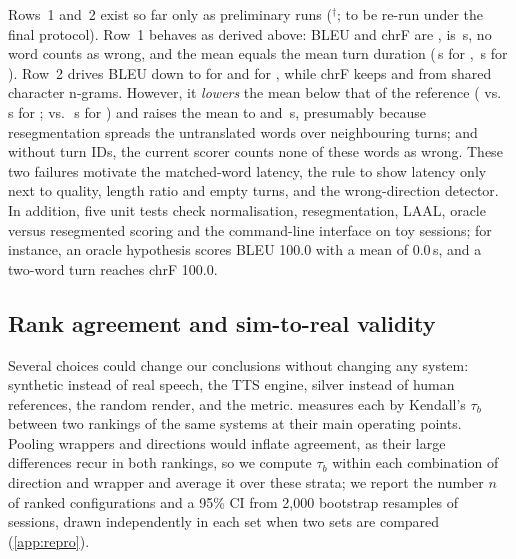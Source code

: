 Rows~1 and~2 exist so far only as preliminary runs ($^\dagger$; to be re-run under the final protocol). Row~1 behaves as derived above: BLEU and chrF are , \eo is \,s, no word counts as wrong, and the mean \laal equals the mean turn duration (\,s for \ende, \,s for \deen). Row~2 drives BLEU down to  for \ende and  for \deen, while chrF keeps  and  from shared character n-grams. However, it \emph{lowers} the mean \laal below that of the reference ( vs.\ \,s for \ende;  vs.\ \,s for \deen) and raises the mean \eo to  and \,s, presumably because resegmentation spreads the untranslated words over neighbouring turns; and without turn IDs, the current scorer counts none of these words as wrong. These two failures motivate the matched-word latency, the rule to show latency only next to quality, length ratio and empty turns, and the wrong-direction detector. In addition, five unit tests check normalisation, resegmentation, LAAL, oracle versus resegmented scoring and the command-line interface on toy sessions; for instance, an oracle hypothesis scores BLEU 100.0 with a mean \eo of 0.0\,s, and a two-word turn reaches chrF 100.0.

\subsection{Rank agreement and sim-to-real validity}



Several choices could change our conclusions without changing any system: synthetic instead of real speech, the TTS engine, silver instead of human references, the random render, and the metric.  measures each by Kendall's $\tau_b$ between two rankings of the same systems at their main operating points. Pooling wrappers and directions would inflate agreement, as their large differences recur in both rankings, so we compute $\tau_b$ within each combination of direction and wrapper and average it over these strata; we report the number $n$ of ranked configurations and a 95\% CI from 2,000 bootstrap resamples of sessions, drawn independently in each set when two sets are compared (\cref{app:repro}).

